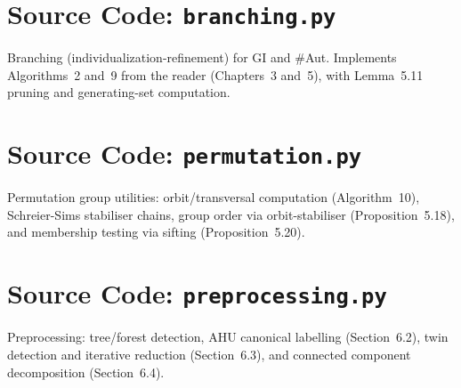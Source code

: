 \documentclass[twoside]{article}
\begin{document}
\section{Source Code: \texttt{branching.py}}\label{app:branching}

Branching (individualization-refinement) for GI and \#Aut. Implements Algorithms~2 and~9 from the reader (Chapters~3 and~5), with Lemma~5.11 pruning and generating-set computation.



\section{Source Code: \texttt{permutation.py}}\label{app:permutation}

Permutation group utilities: orbit/transversal computation (Algorithm~10), Schreier-Sims stabiliser chains, group order via orbit-stabiliser (Proposition~5.18), and membership testing via sifting (Proposition~5.20).



\section{Source Code: \texttt{preprocessing.py}}\label{app:preprocessing}

Preprocessing: tree/forest detection, AHU canonical labelling (Section~6.2), twin detection and iterative reduction (Section~6.3), and connected component decomposition (Section~6.4).


\end{document}
